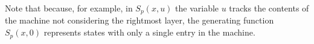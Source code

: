 \documentclass[10pt]{article}
\newcounter{todocounter}
\newcommand{\todo}[1]{
	\addtocounter{todocounter}{1}
	\bigskip
	\noindent{\bf $\ll$ To-do \#\arabic{todocounter}:\rule{10pt}{0pt}#1 $\gg$}\bigskip
}
\theoremstyle{plain}
\theoremstyle{definition}
\begin{document}
%

Note that because, for example, in $S_p(x,u)$ the variable $u$ tracks the contents of the machine not considering the rightmost layer, the generating function $S_p(x,0)$ represents states with only a single entry in the machine.
\end{document}
